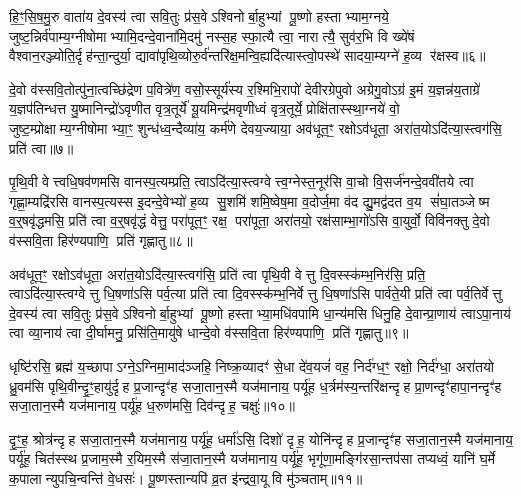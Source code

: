 हि॒ꣳ॒सि॒ष॒मु॒रु वाता॑य दे॒वस्य॑ त्वा सवि॒तुः प्र॑स॒वेऽश्विनोर्बा॒हुभ्यां पू॒ष्णो हस्ताभ्याम॒ग्नये॒ जुष्ट॒न्निर्व॑पाम्य॒ग्नीषोमाभ्यामि॒दन्दे॒वाना॑मि॒दमु॑ नस्स॒ह स्फा॒त्यै त्वा॒ नारात्यै॒ सुव॑र॒भि वि ख्ये॑षं वैश्वान॒रञ्ज्योति॒र्दृह॑न्ता॒न्दुर्या॒ द्यावा॑पृथि॒व्योरु॒र्व॑न्तरि॑क्ष॒मन्वि॒ह्यदि॑त्यास्त्वो॒पस्थे॑ सादया॒म्यग्ने॑ ह॒व्य र॑क्षस्व॥६॥

{\anuvakamend[{मा त्वा॒ षट्च॑त्वारिशच्च। (4)}]}

दे॒वो व॑स्सवि॒तोत्पु॑ना॒त्वच्छि॑द्रेण प॒वित्रे॑ण॒ वसो॒स्सूर्य॑स्य र॒श्मिभि॒रापो॑ देवीरग्रेपुवो अग्रेगु॒वोऽग्र॑ इ॒मं य॒ज्ञन्न॑य॒ताग्रे॑ य॒ज्ञप॑तिन्धत्त यु॒ष्मानिन्द्रो॑ऽवृणीत वृत्र॒तूर्ये॑ यू॒यमिन्द्र॑मवृणीध्वं वृत्र॒तूर्ये॒ प्रोक्षि॑तास्स्था॒ग्नये॑ वो॒ जुष्ट॒म्प्रोक्षाम्य॒ग्नीषोमाभ्या॒ꣳ॒ शुन्ध॑ध्व॒न्दैव्या॑य॒ कर्म॑णे देवय॒ज्याया॒ अव॑धूत॒ꣳ॒ रक्षोऽव॑धूता॒ अरा॑त॒योऽदि॑त्या॒स्त्वग॑सि॒ प्रति॑ त्वा॥७॥

पृ॒थि॒वी वेत्त्वधि॒षव॑णमसि वानस्प॒त्यम्प्रति॒ त्वाऽदि॑त्या॒स्त्वग्वेत्त्व॒ग्नेस्त॒नूर॑सि वा॒चो वि॒सर्ज॑नन्दे॒ववी॑तये त्वा गृह्णा॒म्यद्रि॑रसि वानस्प॒त्यस्स इ॒दन्दे॒वेभ्यो॑ ह॒व्य सु॒शमि॑ शमि॒ष्वेष॒मा व॒दोर्ज॒मा व॑द द्यु॒मद्व॑दत व॒य सं॑घा॒तञ्जेष्म व॒र्॒षवृ॑द्धमसि॒ प्रति॑ त्वा व॒र्॒षवृ॑द्धं वेत्तु॒ परा॑पूत॒ꣳ॒ रक्ष॒ परा॑पूता॒ अरा॑तयो॒ रक्ष॑साम्भा॒गो॑ऽसि वा॒युर्वो॒ विवि॑नक्तु दे॒वो व॑स्सवि॒ता हिर॑ण्यपाणि॒ प्रति॑ गृह्णातु॥८॥

{\anuvakamend[{त्वा॒ भा॒ग एका॑दश च। (5)}]}

अव॑धूत॒ꣳ॒ रक्षोऽव॑धूता॒ अरा॑त॒योऽदि॑त्या॒स्त्वग॑सि॒ प्रति॑ त्वा पृथि॒वी वेत्तु दि॒वस्स्क॑म्भ॒निर॑सि॒ प्रति॒ त्वाऽदि॑त्या॒स्त्वग्वेत्तु धि॒षणा॑ऽसि पर्व॒त्या प्रति॑ त्वा दि॒वस्स्क॑म्भ॒निर्वेत्तु धि॒षणा॑ऽसि पार्वते॒यी प्रति॑ त्वा पर्व॒तिर्वेत्तु दे॒वस्य॑ त्वा सवि॒तुः प्र॑स॒वेऽश्विनोर्बा॒हुभ्यां पू॒ष्णो हस्ताभ्या॒मधि॑वपामि धा॒न्य॑मसि धिनु॒हि दे॒वान्प्रा॒णाय॑ त्वाऽपा॒नाय॑ त्वा व्या॒नाय॑ त्वा दी॒र्घामनु॒ प्रसि॑ति॒मायु॑षे धान्दे॒वो व॑स्सवि॒ता हिर॑ण्यपाणि॒ प्रति॑ गृह्णातु॥९॥

{\anuvakamend[{प्रा॒णाय॑ त्वा॒ पञ्च॑दश च। (6)}]}

धृष्टि॑रसि॒ ब्रह्म॑ य॒च्छापाऽग्ने॒ऽग्निमा॒माद॑ञ्जहि॒ निष्क्र॒व्यादꣳ॑ से॒धा दे॑व॒यजं॑ वह॒ निर्द॑ग्ध॒ꣳ॒ रक्षो॒ निर्द॑ग्धा॒ अरा॑तयो ध्रु॒वम॑सि पृथि॒वीन्दृ॒ꣳ॒हायु॑र्दृह प्र॒जान्दृꣳ॑ह सजा॒तान॒स्मै यज॑मानाय॒ पर्यू॑ह ध॒र्त्रम॑स्य॒न्तरि॑क्षन्दृह प्रा॒णन्दृꣳ॑हापा॒नन्दृꣳ॑ह सजा॒तान॒स्मै यज॑मानाय॒ पर्यू॑ह ध॒रुण॑मसि॒ दिव॑न्दृह॒ चक्षुः॑॥१०॥

दृ॒ꣳ॒ह॒ श्रोत्र॑न्दृह सजा॒तान॒स्मै यज॑मानाय॒ पर्यू॑ह॒ धर्मा॑ऽसि॒ दिशो॑ दृह॒ योनि॑न्दृह प्र॒जान्दृꣳ॑ह सजा॒तान॒स्मै यज॑मानाय॒ पर्यू॑ह॒ चित॑स्स्थ प्र॒जाम॒स्मै र॒यिम॒स्मै स॑जा॒तान॒स्मै यज॑मानाय॒ पर्यू॑ह॒ भृगू॑णा॒मङ्गि॑रसा॒न्तप॑सा तप्यध्वं॒ यानि॑ घ॒र्मे क॒पालान्युपचि॒न्वन्ति॑ वे॒धसः॑। पू॒ष्णस्तान्यपि॑ व्र॒त इ॑न्द्रवा॒यू वि मु॑ञ्चताम्॥११॥

